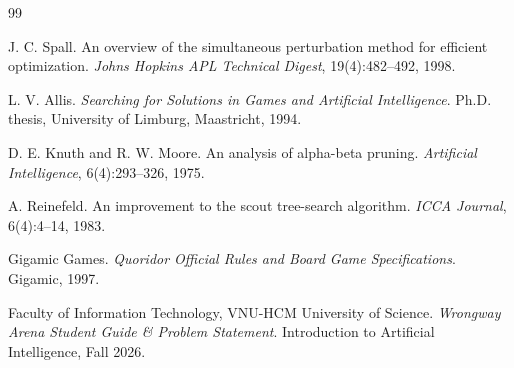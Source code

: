 \begin{thebibliography}{99}

J. C. Spall. An overview of the simultaneous perturbation method for efficient optimization. \textit{Johns Hopkins APL Technical Digest}, 19(4):482--492, 1998.

L. V. Allis. \textit{Searching for Solutions in Games and Artificial Intelligence}. Ph.D. thesis, University of Limburg, Maastricht, 1994.

D. E. Knuth and R. W. Moore. An analysis of alpha-beta pruning. \textit{Artificial Intelligence}, 6(4):293--326, 1975.

A. Reinefeld. An improvement to the scout tree-search algorithm. \textit{ICCA Journal}, 6(4):4--14, 1983.

Gigamic Games. \textit{Quoridor Official Rules and Board Game Specifications}. Gigamic, 1997.

Faculty of Information Technology, VNU-HCM University of Science. \textit{Wrongway Arena Student Guide \& Problem Statement}. Introduction to Artificial Intelligence, Fall 2026.

\end{thebibliography}